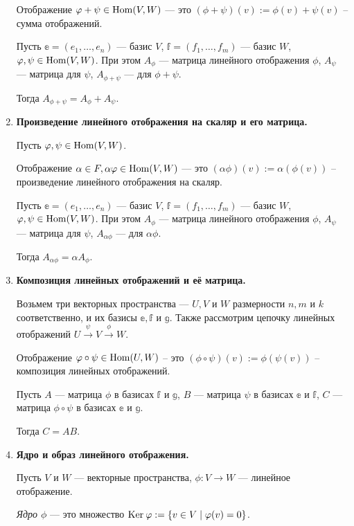 \begin{enumerate}
Отображение $\varphi + \psi \in \mathrm{Hom}(V, W)$ --- это $(\phi + \psi)(v):= \phi(v) + \psi(v)$ -- сумма отображений.

Пусть $\mathbb{e} = (e_1, \ldots, e_n)$ --- базис $V$, $\mathbb{f} = (f_1, \ldots, f_m)$ --- базис $W$, $\varphi, \psi \in \mathrm{Hom}(V, W)$. При этом $A_{\phi}$ --- матрица линейного отображения $\phi$, $A_{\psi}$ --- матрица для $\psi$, $A_{\phi+\psi}$ --- для $\phi + \psi$.

Тогда $A_{\phi+\psi} = A_{\phi} + A_{\psi}$.

\item \textbf{Произведение линейного отображения на скаляр и его матрица.}

Пусть $\varphi, \psi \in \mathrm{Hom}(V, W)$.

Отображение $\alpha \in F, \alpha\varphi \in \mathrm{Hom}(V, W)$ --- это $(\alpha\phi)(v) := \alpha(\phi(v))$ -- произведение линейного отображения на скаляр.

Пусть $\mathbb{e} = (e_1, \ldots, e_n)$ --- базис $V$, $\mathbb{f} = (f_1, \ldots, f_m)$ --- базис $W$, $\varphi, \psi \in \mathrm{Hom}(V, W)$. При этом $A_{\phi}$ --- матрица линейного отображения $\phi$, $A_{\psi}$ --- матрица для $\psi$,  $A_{\alpha\phi}$ --- для $\alpha\phi$.

Тогда $A_{\alpha\phi} = \alpha A_{\phi}$.

\item \textbf{Композиция линейных отображений и её матрица.}

Возьмем три векторных пространства --- $U, V$ и $W$ размерности $n, m$ и $k$ соответственно, и их базисы $\mathbb{e}, \mathbb{f}$ и $\mathbb{g}$. Также рассмотрим цепочку линейных отображений $U \xrightarrow{\psi} V \xrightarrow{\phi} W$. 

Отображение $\varphi\circ\psi \in \mathrm{Hom}(U, W)$ -- это $(\phi\circ\psi)(v) := \phi(\psi(v))$ -- композиция линейных отображений.

Пусть $A$ --- матрица $\phi$ в базисах $\mathbb{f}$ и $\mathbb{g}$, $B$ --- матрица $\psi$ в базисах $\mathbb{e}$ и $\mathbb{f}$, $C$ --- матрица $\phi\circ\psi$ в базисах $\mathbb{e}$ и $\mathbb{g}$.

Тогда $C = AB$.

\item \textbf{Ядро и образ линейного отображения.}

Пусть $V$ и $W$ --- векторные пространства, $\phi: V \rightarrow W$ --- линейное отображение.

\textit{Ядро $\phi$} --- это множество $\mathrm{Ker}\:\varphi := \{v \in V \mid \varphi(v) = 0 \}$.


\end{enumerate}
